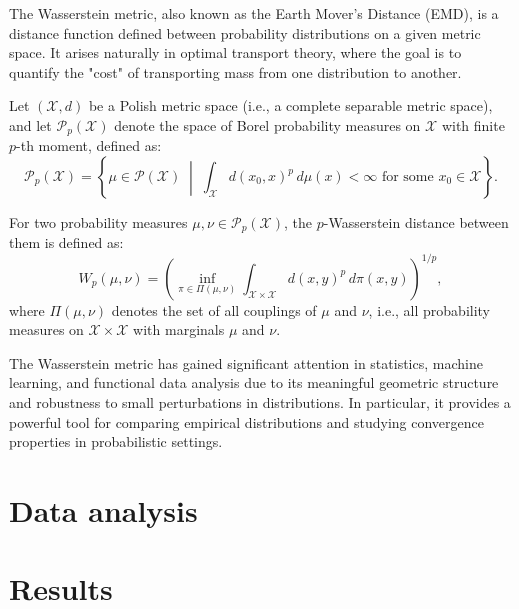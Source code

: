 \documentclass[
	12pt,				%
	oneside,			%
	a4paper,			%
	english,			%
	brazil				%
	]{abntex2ppgsi}
\begin{document}

The Wasserstein metric, also known as the Earth Mover's Distance (EMD), is a distance function defined between probability distributions on a given metric space. It arises naturally in optimal transport theory, where the goal is to quantify the "cost" of transporting mass from one distribution to another.

Let $(\mathcal{X}, d)$ be a Polish metric space (i.e., a complete separable metric space), and let $\mathcal{P}_p(\mathcal{X})$ denote the space of Borel probability measures on $\mathcal{X}$ with finite $p$-th moment, defined as:
\[
\mathcal{P}_p(\mathcal{X}) = \left\{ \mu \in \mathcal{P}(\mathcal{X}) \; \middle| \; \int_{\mathcal{X}} d(x_0, x)^p \, d\mu(x) < \infty \text{ for some } x_0 \in \mathcal{X} \right\}.
\]

For two probability measures $\mu, \nu \in \mathcal{P}_p(\mathcal{X})$, the $p$-Wasserstein distance between them is defined as:
\[
W_p(\mu, \nu) = \left( \inf_{\pi \in \Pi(\mu, \nu)} \int_{\mathcal{X} \times \mathcal{X}} d(x, y)^p \, d\pi(x, y) \right)^{1/p},
\]
where $\Pi(\mu, \nu)$ denotes the set of all couplings of $\mu$ and $\nu$, i.e., all probability measures on $\mathcal{X} \times \mathcal{X}$ with marginals $\mu$ and $\nu$.

The Wasserstein metric has gained significant attention in statistics, machine learning, and functional data analysis due to its meaningful geometric structure and robustness to small perturbations in distributions. In particular, it provides a powerful tool for comparing empirical distributions and studying convergence properties in probabilistic settings.

\chapter{Data analysis}

\chapter{Results}
\end{document}

